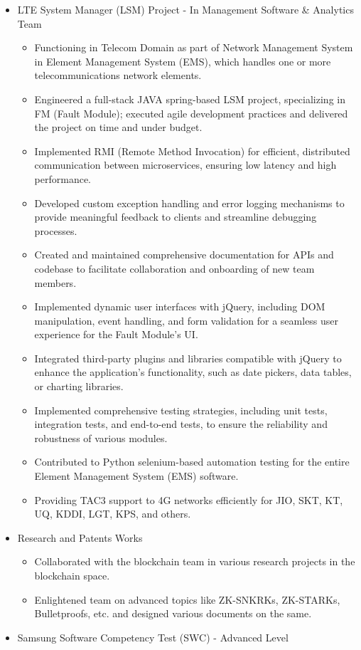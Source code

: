 \documentclass{article}
\begin{document}
\begin{itemize}[noitemsep,nolistsep,leftmargin=*]
    \item {\normalsize {LTE System Manager (LSM) Project - In Management Software \& Analytics Team }
        \begin{itemize}
            \item Functioning in Telecom Domain as part of Network Management System in Element Management System (EMS), which handles one or more telecommunications network elements.
            \item Engineered a full-stack JAVA spring-based LSM project, specializing in FM (Fault Module); executed agile development practices and delivered the project on time and under budget.
            \item Implemented RMI (Remote Method Invocation) for efficient, distributed communication between microservices, ensuring low latency and high performance.
            \item Developed custom exception handling and error logging mechanisms to provide meaningful feedback to clients and streamline debugging processes.
            \item Created and maintained comprehensive documentation for APIs and codebase to facilitate collaboration and onboarding of new team members.
            \item Implemented dynamic user interfaces with jQuery, including DOM manipulation, event handling, and form validation for a seamless user experience for the Fault Module's UI.
            \item Integrated third-party plugins and libraries compatible with jQuery to enhance the application's functionality, such as date pickers, data tables, or charting libraries.
            \item Implemented comprehensive testing strategies, including unit tests, integration tests, and end-to-end tests, to ensure the reliability and robustness of various modules.
            \item Contributed to Python selenium-based automation testing for the entire Element Management System (EMS) software.
            \item Providing TAC3 support to 4G networks efficiently for JIO, SKT, KT, UQ, KDDI, LGT, KPS, and others.
        \end{itemize}
    }
    \item {\normalsize {Research and Patents Works}
        \begin{itemize}
            \item Collaborated with the blockchain team in various research projects in the blockchain space.
            \item Enlightened team on advanced topics like ZK-SNKRKs, ZK-STARKs, Bulletproofs, etc. and designed various documents on the same.
        \end{itemize}
    }
    \item {\normalsize {Samsung Software Competency Test (SWC) - Advanced Level}}
\end{itemize}
\end{document}
